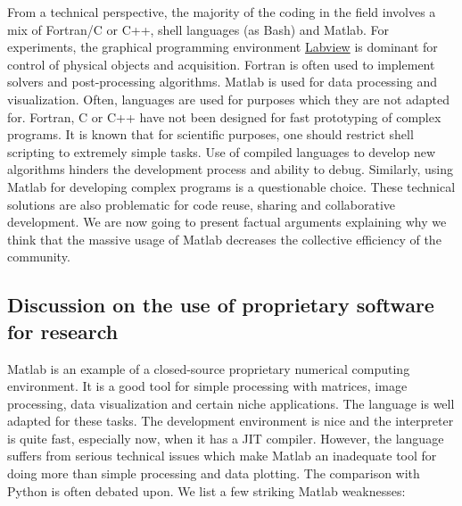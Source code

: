 From a technical perspective, the majority of the coding in the field involves
a mix of Fortran/C or C++, shell languages (as Bash) and Matlab. For
experiments, the graphical programming environment
\href{http://www.ni.com/en-us/shop/labview.html}{Labview} is dominant for
control of physical objects and acquisition. Fortran is often used to implement
solvers and post-processing algorithms. Matlab is used for data processing and
visualization.
%
Often, languages are used for purposes which they are not adapted for.
%
Fortran, C or C++ have not been designed for fast prototyping of complex
programs.
%
It is known that for scientific purposes, one should restrict shell scripting
to extremely simple tasks.
%
Use of compiled languages to develop new algorithms hinders the development
process and ability to debug.
%
Similarly, using Matlab for developing complex programs is a questionable
choice.
%
These technical solutions are also problematic for code reuse, sharing and
collaborative development.
%
We are now going to present factual arguments explaining why we think that the
massive usage of Matlab decreases the collective efficiency of the community.

\subsection{Discussion on the use of proprietary software for research}

Matlab is an example of a closed-source proprietary numerical computing
environment.
%
It is a good tool for simple processing with matrices, image processing, data
visualization and certain niche applications. The language is well adapted for
these tasks. The development environment is nice and the interpreter is quite
fast, especially now, when it has a JIT compiler.
%
However, the language suffers from serious technical issues which make Matlab
an inadequate tool
for doing more than simple processing and data plotting. The comparison with
Python is often debated upon. We list a few striking Matlab weaknesses:

